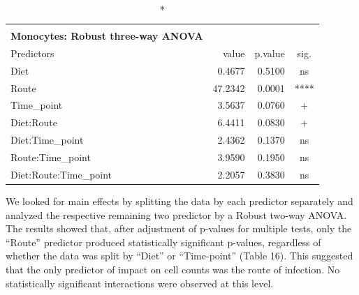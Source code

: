 \documentclass[
  12pt,
  letterpaper,
]{article}
\begin{document}
\begin{longtable}{l|rrc}
\caption*{
{\large \textbf{Appendix Table 15}} \\ 
{\small \textbf{Monocytes: Robust three-way ANOVA}}
} \\ 
\toprule
\multicolumn{1}{l}{Predictors} & value & p.value & sig. \\ 
\midrule\addlinespace[2.5pt]
Diet & 0.4677 & 0.5100 & ns \\ 
Route & 47.2342 & 0.0001 & **** \\ 
Time\_point & 3.5637 & 0.0760 & + \\ 
Diet:Route & 6.4411 & 0.0830 & + \\ 
Diet:Time\_point & 2.4362 & 0.1370 & ns \\ 
Route:Time\_point & 3.9590 & 0.1950 & ns \\ 
Diet:Route:Time\_point & 2.2057 & 0.3830 & ns \\ 
\bottomrule
\end{longtable}

We looked for main effects by splitting the data by each predictor separately and analyzed the respective remaining two predictor by a Robust two-way ANOVA. The results showed that, after adjustment of p-values for multiple tests, only the ``Route'' predictor produced statistically significant p-values, regardless of whether the data was split by ``Diet'' or ``Time-point'' (Table 16). This suggested that the only predictor of impact on cell counts was the route of infection. No statistically significant interactions were observed at this level.
\end{document}
